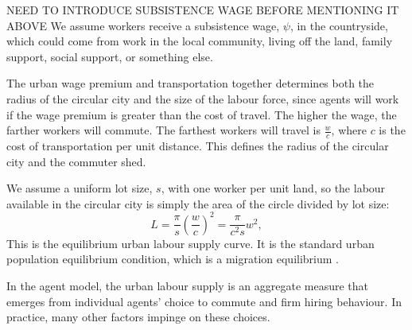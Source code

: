  
NEED TO INTRODUCE SUBSISTENCE WAGE BEFORE MENTIONING IT ABOVE We assume workers receive a \gls{subsistence wage}, $\psi$, in the countryside, which could come from work in the local community, living off the land, family support, social support, or something else. %

The {urban wage premium} and transportation together determines both the radius of the circular city and the size of the labour force, %
since agents will work if the wage premium is greater than the cost of travel. %
The higher the wage, the  farther workers will commute.
The farthest workers will travel  is $\frac{w}{{c}}$, where ${c}$ is the cost of transportation per unit distance. This defines the radius of the circular city and the commuter shed.

We assume  a uniform lot size, $s$, with one worker per unit land, so the labour available in the \gls{circular city} is simply the area of the circle divided by lot size: 
\begin{equation}
 L = \frac{\pi}{s} \left(\frac{w}{{c}}\right)^2
   =\frac{\pi}{{c}^2 s} w^2,
\label{eqn-labour-supply1}
\end{equation}
This is the equilibrium \gls{urban labour supply} curve. It is the standard urban \gls{population equilibrium} condition, which is a \gls{migration equilibrium} \cite{migration_equilibOR_pop_equilib_condition}. %

In the agent model, the \gls{urban labour supply} is an \gls{aggregate} measure that emerges from individual agents' choice to commute %
and firm hiring behaviour. %
In practice, many other factors impinge on these choices. %

